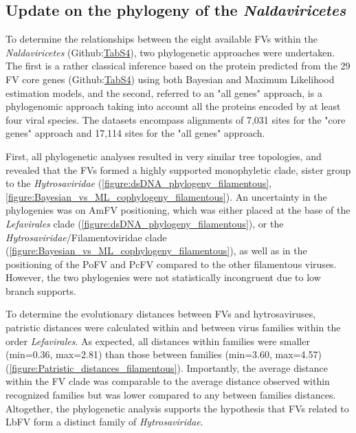 \subsection{Update on the phylogeny of the \textit{Naldaviricetes}} 

To determine the relationships between the eight available FVs within the \textit{Naldaviricetes} (Github:\href{https://github.com/BenjaminGuinet/PhD_defense/blob/main/Supplementary_paper2/Table%20S2.xlsx}{TabS4}), two phylogenetic approaches were undertaken. The first is a rather classical inference based on the protein predicted from the 29 FV core genes (Github:\href{https://github.com/BenjaminGuinet/PhD_defense/blob/main/Supplementary_paper2/Table%20S4.xlsx}{TabS4}) using both Bayesian and Maximum Likelihood estimation models, and the second, referred to an "all genes" approach, is a phylogenomic approach taking into account all the proteins encoded by at least four viral species. The datasets encompass alignments of 7,031 sites for the "core genes" approach and 17,114 sites for the "all genes" approach. 

First, all phylogenetic analyses resulted in very similar tree topologies, and revealed that the FVs formed a highly supported monophyletic clade, sister group to the \textit{Hytrosaviridae} (\figurename{\ref{figure:dsDNA_phylogeny_filamentous}}, \figurename{\ref{figure:Bayesian_vs_ML_cophylogeny_filamentous}}). An uncertainty in the phylogenies was on AmFV positioning, which was either placed at the base of the \textit{Lefavirales} clade (\figurename{\ref{figure:dsDNA_phylogeny_filamentous}}), or the \textit{Hytrosaviridae}/Filamentoviridae clade (\figurename{\ref{figure:Bayesian_vs_ML_cophylogeny_filamentous}}), as well as in the positioning of the PoFV and PcFV compared to the other filamentous viruses. However, the two phylogenies were not statistically incongruent due to low branch supports.  

To determine the evolutionary distances between FVs and hytrosaviruses, patristic distances were calculated within and between virus families within the order \textit{Lefavirales}. As expected, all distances within families were smaller (min=0.36, max=2.81) than those between families (min=3.60, max=4.57) (\figurename{\ref{figure:Patristic_distances_filamentous}}). Importantly, the average distance within the FV clade was comparable to the average distance observed within recognized families but was lower compared to any between families distances. Altogether, the phylogenetic analysis supports the hypothesis that FVs related to LbFV form a distinct family of \textit{Hytrosaviridae}.  


